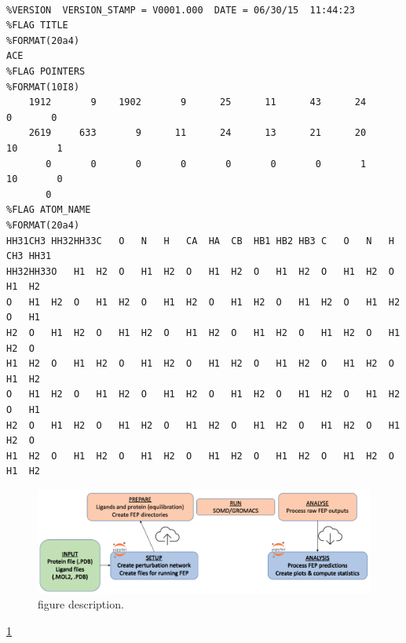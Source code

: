 {\scriptsize
\begin{lstlisting}[columns=flexible]

%VERSION  VERSION_STAMP = V0001.000  DATE = 06/30/15  11:44:23                  
%FLAG TITLE                                                                     
%FORMAT(20a4)                                                                   
ACE                                                                             
%FLAG POINTERS                                                                  
%FORMAT(10I8)                                                                   
    1912       9    1902       9      25      11      43      24       0       0
    2619     633       9      11      24      13      21      20      10       1
       0       0       0       0       0       0       0       1      10       0
       0
%FLAG ATOM_NAME                                                                 
%FORMAT(20a4)                                                                   
HH31CH3 HH32HH33C   O   N   H   CA  HA  CB  HB1 HB2 HB3 C   O   N   H   CH3 HH31
HH32HH33O   H1  H2  O   H1  H2  O   H1  H2  O   H1  H2  O   H1  H2  O   H1  H2  
O   H1  H2  O   H1  H2  O   H1  H2  O   H1  H2  O   H1  H2  O   H1  H2  O   H1  
H2  O   H1  H2  O   H1  H2  O   H1  H2  O   H1  H2  O   H1  H2  O   H1  H2  O   
H1  H2  O   H1  H2  O   H1  H2  O   H1  H2  O   H1  H2  O   H1  H2  O   H1  H2  
O   H1  H2  O   H1  H2  O   H1  H2  O   H1  H2  O   H1  H2  O   H1  H2  O   H1  
H2  O   H1  H2  O   H1  H2  O   H1  H2  O   H1  H2  O   H1  H2  O   H1  H2  O   
H1  H2  O   H1  H2  O   H1  H2  O   H1  H2  O   H1  H2  O   H1  H2  O   H1  H2 
\end{lstlisting}
}
\begin{figure}[htp]
\includegraphics[width=\linewidth]{04_fep/inputs/tut_imgs/fep_pipeline.png}
\caption{figure description.}
\label{label_of_figure}
\end{figure}

\ref{label_of_figure}